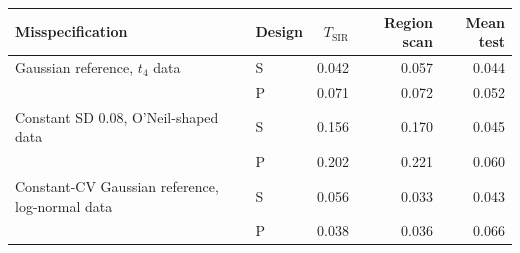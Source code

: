 \begin{tabular}{@{}llrrr@{}}
\toprule
Misspecification & Design & $T_{\mathrm{SIR}}$ & Region scan & Mean test\\
\midrule
Gaussian reference, $t_4$ data & S & 0.042 & 0.057 & 0.044\\
 & P & 0.071 & 0.072 & 0.052\\
Constant SD 0.08, O'Neil-shaped data & S & 0.156 & 0.170 & 0.045\\
 & P & 0.202 & 0.221 & 0.060\\
Constant-CV Gaussian reference, log-normal data & S & 0.056 & 0.033 & 0.043\\
 & P & 0.038 & 0.036 & 0.066\\
\bottomrule
\end{tabular}

